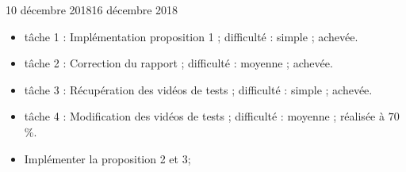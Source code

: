 \documentclass[12pt]{fiche-rd-info}
\begin{document}

\begin{fichesuivi}{10 décembre 2018}{16 décembre 2018}

	\begin{travaileffectue}
		\begin{itemize}
			\item tâche 1 : Implémentation proposition 1 ; difficulté : simple ; achevée.
			\item tâche 2 : Correction du rapport ; difficulté : moyenne ; achevée.
			\item tâche 3 : Récupération des vidéos de tests ; difficulté : simple ; achevée.
			\item tâche 4 : Modification des vidéos de tests ; difficulté : moyenne ; réalisée à  $70$ \%.
		\end{itemize}
	\end{travaileffectue}



	\begin{planification}
		\begin{itemize}
			\item Implémenter la proposition 2 et 3;
		\end{itemize}
	\end{planification}
\end{fichesuivi}
\end{document}
